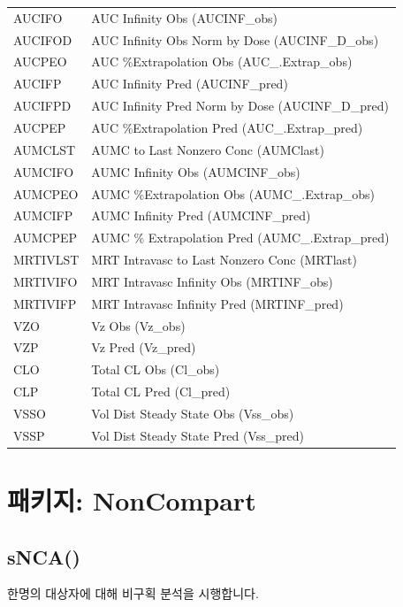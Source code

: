 \documentclass[9pt,]{krantz}
\begin{document}
\begin{longtable}[t]{ll}
AUCIFO & AUC Infinity Obs (AUCINF\_obs)\\
AUCIFOD & AUC Infinity Obs Norm by Dose (AUCINF\_D\_obs)\\
\addlinespace
AUCPEO & AUC \%Extrapolation Obs (AUC\_.Extrap\_obs)\\
AUCIFP & AUC Infinity Pred (AUCINF\_pred)\\
AUCIFPD & AUC Infinity Pred Norm by Dose (AUCINF\_D\_pred)\\
AUCPEP & AUC \%Extrapolation Pred (AUC\_.Extrap\_pred)\\
AUMCLST & AUMC to Last Nonzero Conc (AUMClast)\\
\addlinespace
AUMCIFO & AUMC Infinity Obs (AUMCINF\_obs)\\
AUMCPEO & AUMC \%Extrapolation Obs (AUMC\_.Extrap\_obs)\\
AUMCIFP & AUMC Infinity Pred (AUMCINF\_pred)\\
AUMCPEP & AUMC \% Extrapolation Pred (AUMC\_.Extrap\_pred)\\
MRTIVLST & MRT Intravasc to Last Nonzero Conc (MRTlast)\\
\addlinespace
MRTIVIFO & MRT Intravasc Infinity Obs (MRTINF\_obs)\\
MRTIVIFP & MRT Intravasc Infinity Pred (MRTINF\_pred)\\
VZO & Vz Obs (Vz\_obs)\\
VZP & Vz Pred (Vz\_pred)\\
CLO & Total CL Obs (Cl\_obs)\\
\addlinespace
CLP & Total CL Pred (Cl\_pred)\\
VSSO & Vol Dist Steady State Obs (Vss\_obs)\\
VSSP & Vol Dist Steady State Pred (Vss\_pred)\\
\bottomrule
\end{longtable}

\chapter{패키지: NonCompart}\label{-noncompart}

\section{sNCA()}\label{snca}

한명의 대상자에 대해 비구획 분석을 시행합니다.
\end{document}
